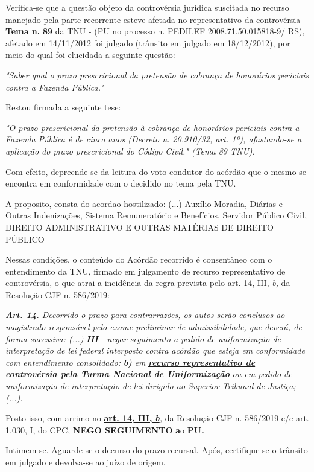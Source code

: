 \documentclass[12pt]{article}
\begin{document}
\justifying
\noindent Verifica-se que a questão objeto da controvérsia jurídica suscitada no recurso manejado pela parte recorrente esteve afetada no representativo da controvérsia - \textbf{Tema n. }\textbf{89} da TNU - (PU no processo n. PEDILEF 2008.71.50.015818-9/ RS),  afetado em 14/11/2012 foi julgado (trânsito em julgado em 18/12/2012), por meio do qual foi elucidada a seguinte questão:

\noindent \textit{"Saber qual o prazo prescricional da pretensão de cobrança de honorários periciais contra a Fazenda Pública."}

\noindent Restou firmada a seguinte tese:

\noindent \textit{"O prazo prescricional da pretensão à cobrança de honorários periciais contra a Fazenda Pública é de cinco anos (Decreto n. 20.910/32, art. 1º), afastando-se a aplicação do prazo prescricional do Código Civil." (Tema 89 TNU).}

\noindent Com efeito, depreende-se da leitura do voto condutor do acórdão que o mesmo se encontra em conformidade com o decidido no  tema pela TNU.

\noindent A proposito, consta do acordao hostilizado: (...) Auxílio-Moradia, Diárias e Outras Indenizações, Sistema Remuneratório e Benefícios, Servidor Público Civil, DIREITO ADMINISTRATIVO E OUTRAS MATÉRIAS DE DIREITO PÚBLICO

\noindent Nessas condições, o conteúdo do Acórdão recorrido é consentâneo com o entendimento da TNU, firmado em julgamento de recurso representativo de controvérsia, o que atrai a incidência da regra prevista pelo art. 14, III, \textit{b,} da Resolução CJF n. 586/2019:

\noindent \textit{\textbf{Art. 14.}}\textit{ Decorrido o prazo para contrarrazões, os autos serão conclusos ao magistrado responsável pelo exame preliminar de admissibilidade, que deverá, de forma sucessiva: (...) }\textit{\textbf{III }}\textit{- negar seguimento a pedido de uniformização de interpretação de lei federal interposto contra acórdão que esteja em conformidade com entendimento consolidado: }\textit{\textbf{b)}}\textit{ em }\uline{\textit{\textbf{recurso representativo de controvérsia pela Turma Nacional de Uniformização}}}\textit{ ou em pedido de uniformização de interpretação de lei dirigido ao Superior Tribunal de Justiça;(...).}

\noindent Posto isso, com arrimo no \uline{\textbf{art. 14, III, }}\uline{\textit{\textbf{b}}}\textit{,} da Resolução CJF n. 586/2019 c/c art. 1.030, I, do CPC, \textbf{NEGO SEGUIMENTO }\textbf{a}o\textbf{ PU}\textbf{.}

\noindent Intimem-se. Aguarde-se o decurso do prazo recursal. Após, certifique-se o trânsito em julgado e devolva-se ao juízo de origem.
\end{document}
